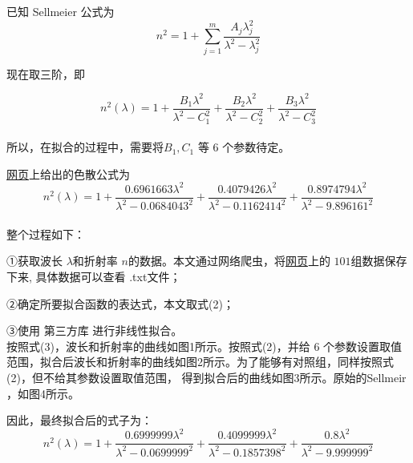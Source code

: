 \documentclass[12pt, a4paper, oneside, UTF8]{ctexart}
\begin{document}
已知 Sellmeier 公式为
\begin{equation}
n^{2} = 1 + \sum_{j=1}^{m}\frac{A_{j}\lambda _{j}^{2}}{\lambda^{2}-\lambda _{j}^{2} }
\end{equation}

现在取三阶，即

\begin{equation}
    n^{2}(\lambda) = 1 + \frac{B_1 \lambda^2}{\lambda^2 - C_1^2} + \frac{B_2 \lambda^2}{\lambda^2 - C_2^2}
+ \frac{B_3 \lambda^2}{\lambda^2 - C_3^2}
\end{equation}\\
所以，在拟合的过程中，需要将$B_1,C_1$ 等 6 个参数待定。

\href{https://refractiveindex.info/?shelf=main&book=SiO2&page=Malitson}{网页}上给出的色散公式为
\begin{equation}
    n^{2}(\lambda) = 1 + \frac{0.6961663 \lambda^2}{\lambda^2 - 0.0684043^2} + \frac{0.4079426 \lambda^2}{\lambda^2 - 0.1162414^2}
+ \frac{0.8974794 \lambda^2}{\lambda^2 - 9.896161^2}
\end{equation}
\\

整个过程如下：

①获取波长 \@$\lambda$\@ 和折射率 \@$n$\@ 的数据。本文通过网络爬虫，将\href{https://refractiveindex.info/?shelf=main&book=SiO2&page=Malitson}{网页}上的 \@$101$\@ 组数据保存下来,
具体数据可以查看 \@data.txt\@ 文件；

②确定所要拟合函数的表达式，本文取式(2)；

③使用 \@python\@ 第三方库 \@scipy\@ 进行非线性拟合。
\\

按照式(3)，波长和折射率的曲线如图\@ 1所示。按照式(2)，并给 6 个参数设置取值范围，拟合后波长和折射率的曲线如图\@ 2所示。为了能够有对照组，同样按照式(2)，但不给其参数设置取值范围，
得到拟合后的曲线如图\@ 3所示。原始的\@ Sellmeir ，如图\@ 4所示。

因此，最终拟合后的式子为：
\begin{equation}
    n^{2}(\lambda) = 1 + \frac{0.6999999 \lambda^2}{\lambda^2 - 0.0699999^2} + \frac{0.4099999 \lambda^2}{\lambda^2 - 0.1857398^2}
+ \frac{0.8 \lambda^2}{\lambda^2 - 9.999999^2}
\end{equation}
\end{document}
